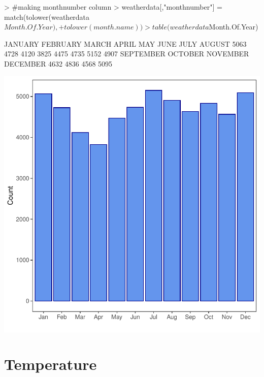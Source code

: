 \documentclass[11pt, a4paper]{article}
\begin{document}
\begin{Schunk}
\begin{Sinput}
> #making monthnumber column
> weatherdata[,"monthnumber"] = match(tolower(weatherdata$Month.Of.Year), 
+                             tolower(month.name))
> table(weatherdata$Month.Of.Year)
\end{Sinput}
\begin{Soutput}
  JANUARY  FEBRUARY     MARCH     APRIL       MAY      JUNE      JULY    AUGUST 
     5063      4728      4120      3825      4475      4735      5152      4907 
SEPTEMBER   OCTOBER  NOVEMBER  DECEMBER 
     4632      4836      4568      5095 
\end{Soutput}
\end{Schunk}
\includegraphics{variableinvestigation-003}





\section{Temperature}
\end{document}
